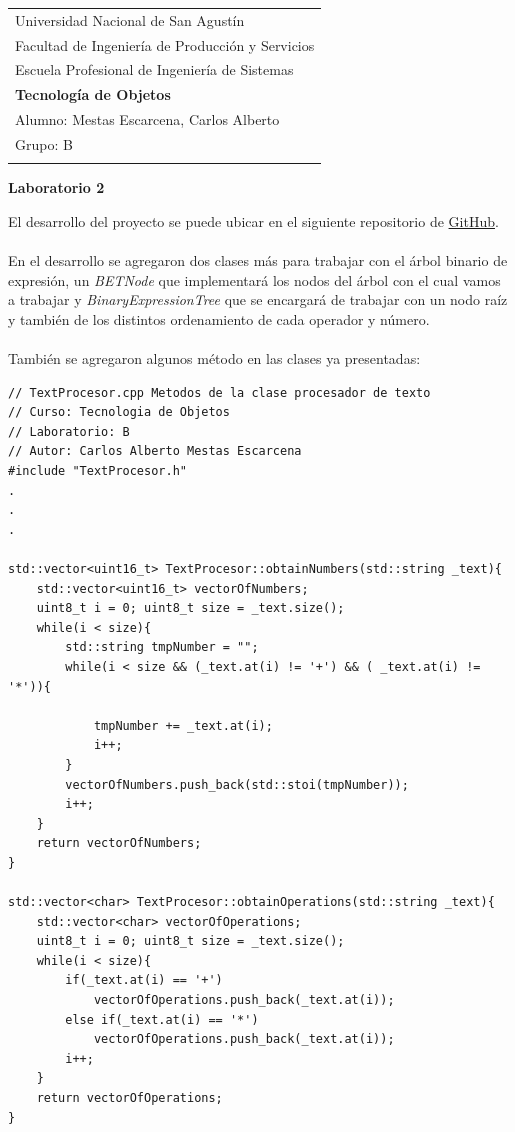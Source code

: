 \documentclass[a4paper,12pt]{article}
\begin{document}
\thispagestyle{empty}

\begin{tabular}{p{15.5cm}} 
\large Universidad Nacional de San Agustín \\ 
\large Facultad de Ingeniería de Producción y Servicios \\
\large Escuela Profesional de Ingeniería de Sistemas \\
{\LARGE \bf Tecnología de Objetos} \\
\vspace{1mm}
Alumno: Mestas Escarcena, Carlos Alberto \\
Grupo: B \\
\hline \\
\end{tabular} 

\begin{center} 
	{\LARGE \bf Laboratorio 2}
	\vspace{2mm}
\end{center}  

El desarrollo del proyecto se puede ubicar en el siguiente repositorio de  \textcolor{blue}{
    \href{https://github.com/CarlosMestas/calculator_cmestas}{GitHub}}.
\\
\\
En el desarrollo se agregaron dos clases más para trabajar con el árbol binario de expresión, un \textit{BETNode} que implementará los nodos del árbol con el cual vamos a trabajar y \textit{BinaryExpressionTree} que se encargará de trabajar con un nodo raíz y también de los distintos ordenamiento de cada operador y número.
\\
\\
También se agregaron algunos método en las clases ya presentadas:

\begin{verbatim} 
// TextProcesor.cpp Metodos de la clase procesador de texto
// Curso: Tecnologia de Objetos
// Laboratorio: B
// Autor: Carlos Alberto Mestas Escarcena
#include "TextProcesor.h"
.
.
.

std::vector<uint16_t> TextProcesor::obtainNumbers(std::string _text){
    std::vector<uint16_t> vectorOfNumbers;
    uint8_t i = 0; uint8_t size = _text.size();
    while(i < size){
        std::string tmpNumber = "";
        while(i < size && (_text.at(i) != '+') && ( _text.at(i) != '*')){

            tmpNumber += _text.at(i);
            i++;
        } 
        vectorOfNumbers.push_back(std::stoi(tmpNumber));
        i++;
    }
    return vectorOfNumbers;
}

std::vector<char> TextProcesor::obtainOperations(std::string _text){
    std::vector<char> vectorOfOperations;
    uint8_t i = 0; uint8_t size = _text.size();
    while(i < size){
        if(_text.at(i) == '+')
            vectorOfOperations.push_back(_text.at(i));
        else if(_text.at(i) == '*')
            vectorOfOperations.push_back(_text.at(i));
        i++;
    }
    return vectorOfOperations;
}
\end{verbatim} 
\end{document}

